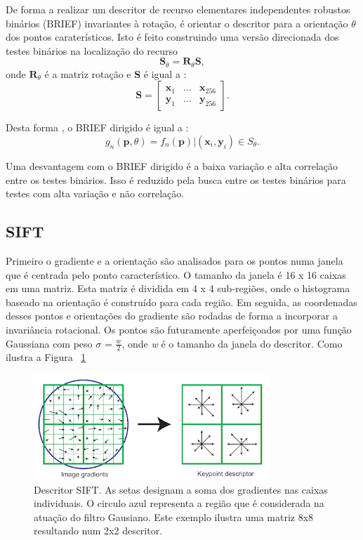 De forma a realizar um descritor de recurso elementares independentes robustos binários (BRIEF) invariantes à rotação, é orientar o descritor para a orientação $\theta$ dos pontos caraterísticos. Isto é feito construindo uma versão direcionada dos testes binários na localização do recurso \[ \textbf{$\textbf{S}_{\theta} = \textbf{R}_{\theta}\textbf{S}$} ,\] onde \textbf{$\textbf{R}_{\theta}$} é a matriz rotação e \textbf{S} é igual a : \[ \textbf{S} = \left[ \begin{array}{ccc}
		\textbf{x}_1 & ... & \textbf{x}_{256}\\
		\textbf{y}_1 & ... & \textbf{y}_{256}
		\end{array} \right] . \]

Desta forma , o BRIEF dirigido é igual a : \[ g_n(\textbf{p},\theta) = f_n(\textbf{p})|(\textbf{x}_i,\textbf{y}_i) \in S_{\theta} .\]


Uma desvantagem com o BRIEF dirigido é a baixa variação e alta correlação entre os testes binários. Isso é reduzido pela busca entre os testes binários para testes com alta variação e não correlação. 	

\subsection{SIFT}

Primeiro o gradiente e a orientação são analisados para os pontos numa janela que é centrada pelo ponto característico. O tamanho da janela é 16 x 16 caixas em uma matriz. Esta matriz é dividida em 4 x 4 sub-regiões, onde o histograma baseado na orientação é construído para cada região. Em seguida, as coordenadas desses pontos e orientações do gradiente são rodadas de forma a incorporar a invariância rotacional. Os pontos são futuramente aperfeiçoados por uma função Gaussiana com peso $\sigma$ = $\frac{w}{2}$, onde \textit{w} é o tamanho da janela do descritor. Como ilustra a Figura ~\ref{fig:siftdescriptor}

\begin{figure}[h!]
	\centering
	\includegraphics[width=0.7\linewidth]{figures/SIFTdescriptor}
	\caption{Descritor SIFT. As setas designam a soma dos gradientes nas caixas individuais. O circulo azul representa a região que é considerada na atuação do filtro Gausiano. Este exemplo ilustra uma matriz 8x8 resultando num 2x2 descritor. \cite{VisualOdometryRodasVehicles}}
	\label{fig:siftdescriptor}
\end{figure}

